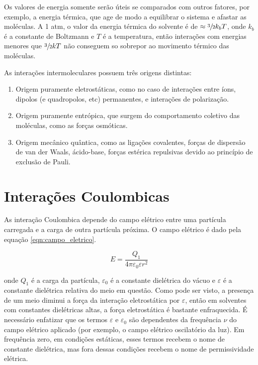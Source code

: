 	Os valores de energia somente serão úteis se comparados com outros fatores, por exemplo, a energia térmica, que age de modo a equilibrar o sistema e afastar as moléculas. A 1 atm, o valor da energia térmica do solvente é de \(\approx \sfrac{3}{2} k_b T\), onde \(k_b\) é a constante de Boltzmann e \(T\) é a temperatura, então interações com energias menores que \(\sfrac{3}{2}kT\) não conseguem so sobrepor ao movimento térmico das moléculas.  %
	
	As interações intermoleculares possuem três origens distintas:
	
	\begin{enumerate}[noitemsep] 
		\item Origem puramente eletrostáticas, como no caso de interações entre íons, dipolos (e quadropolos, etc) permanentes, e interações de polarização.
		\item Origem puramente entrópica, que surgem do comportamento coletivo das moléculas, como as forças osmóticas.
		\item Origem mecânico quântica, como as ligações covalentes, forças de dispersão de van der Waals, ácido-base, forças estérica repulsivas devido ao princípio de exclusão de Pauli.
	\end{enumerate} 
	
	\section{Interações Coulombicas} 
	
	As interação Coulombica depende do campo elétrico entre uma partícula carregada e a carga de outra partícula próxima. O campo elétrico é dado pela equação \ref{eqn:campo_eletrico}.
	
	\begin{equation}
		E = \dfrac{Q_1}{4\pi\varepsilon_0\varepsilon r^2}
		\label{eqn:campo_eletrico}
	\end{equation} 

	\noindent onde \(Q_1\) é a carga da partícula, \(\varepsilon_0\) é a constante dielétrica do vácuo e \(\varepsilon\) é a constante dielétrica relativa do meio em questão.  Como pode ser visto, a presença de um meio diminui a força da interação eletrostática por \(\varepsilon\), então em solventes com constantes dielétricas altas, a força eletrostática é bastante enfraquecida. É necessário enfatizar que os termos \(\varepsilon\) e \(\varepsilon_0\) são dependentes da frequência \(\nu\) do campo elétrico aplicado (por exemplo, o campo elétrico oscilatório da luz). Em frequência zero, em condições estáticas, esses termos recebem o nome de constante dielétrica, mas fora dessas condições recebem o nome de permissividade elétrica. 
	
